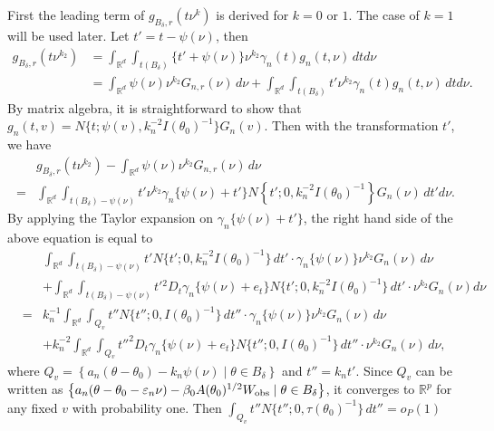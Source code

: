 \documentclass{article}
\begin{document}
	First the leading term of $g_{B_{\delta},r}(t\nu^{k})$ is derived
	for $k=0$ or $1$. The case of $k=1$ will be used later. Let $t'=t-\psi(\nu)$,
	then 
	\begin{align*}
	g_{B_{\delta},r}(t\nu^{k_{2}}) & =\int_{\mathbb{R}^{d}}\int_{t(B_{\delta})}\{t'+\psi(\nu)\}\nu^{k_{2}}\gamma_{n}(t)g_{n}(t,\nu)\,dtd\nu\\
	& =\int_{\mathbb{R}^{d}}\psi(\nu)\nu^{k_{2}}G_{n,r}(\nu)\,d\nu+\int_{\mathbb{R}^{d}}\int_{t(B_{\delta})}t'\nu^{k_{2}}\gamma_{n}(t)g_{n}(t,\nu)\,dtd\nu.
	\end{align*}
	By matrix algebra, it is straightforward to show that $g_{n}(t,v)=N\{t;\psi(v),k_{n}^{-2}I(\theta_{0})^{-1}\}G_{n}(v)$.
	Then with the transformation $t'$, we have
	\begin{align*}
	& g_{B_{\delta},r}(t\nu^{k_{2}})-\int_{\mathbb{R}^{d}}\psi(\nu)\nu^{k_{2}}G_{n,r}(\nu)\,d\nu\\
	= & \int_{\mathbb{R}^{d}}\int_{t(B_{\delta})-\psi(\nu)}t'\nu^{k_{2}}\gamma_{n}\{\psi(\nu)+t'\}N\left\{ t';0,k_{n}^{-2}I(\theta_{0})^{-1}\right\} G_{n}(\nu)\,dt'd\nu.
	\end{align*}
	By applying the Taylor expansion on $\gamma_{n}\{\psi(\nu)+t'\}$,
	the right hand side of the above equation is equal to 
	\begin{eqnarray}
	&  & \int_{\mathbb{R}^{d}}\int_{t(B_{\delta})-\psi(\nu)}t'N\{t';0,k_{n}^{-2}I(\theta_{0})^{-1}\}\,dt'\cdot\gamma_{n}\{\psi(\nu)\}\nu^{k_{2}}G_{n}(\nu)\,d\nu\nonumber \\
	&  & +\int_{\mathbb{R}^{d}}\int_{t(B_{\delta})-\psi(\nu)}t'{}^{2}D_{t}\gamma_{n}\{\psi(\nu)+e_{t}\}N\{t';0,k_{n}^{-2}I(\theta_{0})^{-1}\}\,dt'\cdot\nu^{k_{2}}G_{n}(\nu)d\nu\nonumber \\
	& = & k_{n}^{-1}\int_{\mathbb{R}^{d}}\int_{Q_{v}}t''N\{t'';0,I(\theta_{0})^{-1}\}\,dt''\cdot\gamma_{n}\{\psi(\nu)\}\nu^{k_{2}}G_{n}(\nu)\,d\nu\nonumber \\
	&  & +k_{n}^{-2}\int_{\mathbb{R}^{d}}\int_{Q_{v}}t''^{2}D_{t}\gamma_{n}\{\psi(\nu)+e_{t}\}N\{t'';0,I(\theta_{0})^{-1}\}\,dt''\cdot\nu^{k_{2}}G_{n}(\nu)\,d\nu,\label{eq5}
	\end{eqnarray}
	where $Q_{v}=\left\{ a_{n}(\theta-\theta_{0})-k_{n}\psi(\nu)\mid\theta\in B_{\delta}\right\} $
	and $t''=k_{n}t'$. Since $Q_{v}$ can be written as $\left\{ a_{n}(\theta-\theta_{0}-\varepsilon_{n}\nu)-\beta_{0}A(\theta_{0})^{1/2}W_{\rm obs}\mid\theta\in B_{\delta}\right\} $,
	it converges to $\mathbb{R}^{p}$ for any fixed $v$ with probability
	one. Then $\int_{Q_{v}}t''N\{t'';0,\tau(\theta_{0})^{-1}\}\,dt''=o_{P}(1)$
\end{document}
